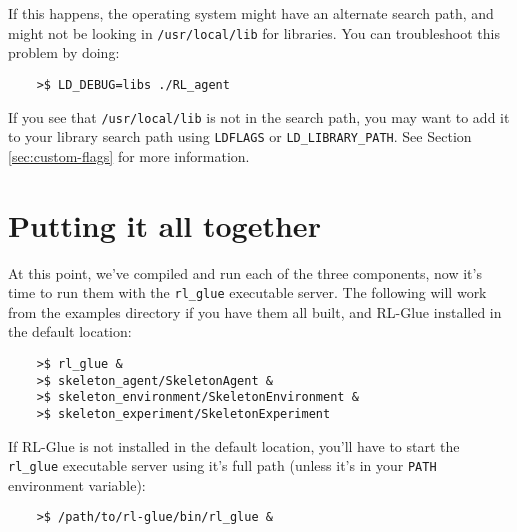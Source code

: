 \documentclass[11pt]{article}
\begin{document}
If this happens, the operating system might have an alternate search path, and might not be looking in \texttt{/usr/local/lib} for libraries. 
You can troubleshoot this problem by doing:
\begin{verbatim}
	>$ LD_DEBUG=libs ./RL_agent
\end{verbatim}
If you see that \texttt{/usr/local/lib} is not in the search path, you may want to add it to your library search path using \texttt{LDFLAGS} or \texttt{LD\_LIBRARY\_PATH}.  See Section \ref{sec:custom-flags} for more information.  

\section{Putting it all together}
At this point, we've compiled and run each of the three components, now it's time to run them with the \texttt{rl\_glue} executable server.  The following will work from the examples directory if you have them all built, and RL-Glue installed in the default location:
\begin{verbatim}
	>$ rl_glue &
	>$ skeleton_agent/SkeletonAgent &
	>$ skeleton_environment/SkeletonEnvironment &
	>$ skeleton_experiment/SkeletonExperiment	
\end{verbatim}

If RL-Glue is not installed in the default location, you'll have to start the \texttt{rl\_glue} executable server using it's full path (unless it's in your \texttt{PATH} environment variable):
\begin{verbatim}
	>$ /path/to/rl-glue/bin/rl_glue &
\end{verbatim}
\end{document}
